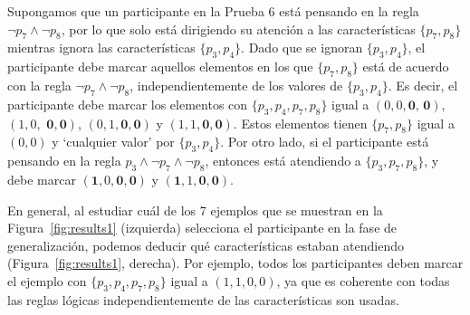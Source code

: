 Supongamos que un participante en la Prueba 6 está pensando en la regla $ \lnot p_7 \land \lnot p_8 $, por lo que solo está dirigiendo su atención a las características $ \{p_7, p_8 \} $ mientras ignora las características $ \{p_3, p_4 \} $. Dado que se ignoran $ \{p_3, p_4 \} $, el participante debe marcar aquellos elementos en los que $ \{p_7, p_8 \} $ está de acuerdo con la regla $ \lnot p_7 \land \lnot p_8 $, independientemente de los valores de $ \{p_3, p_4 \} $. Es decir, el participante debe marcar los elementos con $ \{p_3, p_4, p_7, p_8 \} $ igual a $ (0,0, \textbf {0, 0}) $, $ (1,0, \textbf { 0}, \textbf {0}) $, $ (0,1, \textbf {0}, \textbf {0}) $ y $ (1,1, \textbf {0}, \textbf {0}) $. Estos elementos tienen $ \{p_7, p_8 \} $ igual a $ (0,0) $ y `cualquier valor' por $ \{p_3, p_4 \} $. Por otro lado, si el participante está pensando en la regla $ p_3 \land \lnot p_7 \land \lnot p_8 $, entonces está atendiendo a $ \{p_3, p_7, p_8 \} $, y debe marcar $ ( \textbf {1}, 0, \textbf {0}, \textbf {0}) $ y $ (\textbf {1}, 1, \textbf {0}, \textbf {0}) $.

En general, al estudiar cuál de los 7 ejemplos que se muestran en la Figura~\ref{fig:results1} (izquierda) selecciona el participante en la fase de generalización, podemos deducir qué características estaban atendiendo (Figura~\ref{fig:results1}, derecha). Por ejemplo, todos los participantes deben marcar el ejemplo con $ \{p_3, p_4, p_7, p_8 \} $ igual a $ (1,1,0,0) $, ya que es coherente con todas las reglas lógicas independientemente de las características son usadas.


